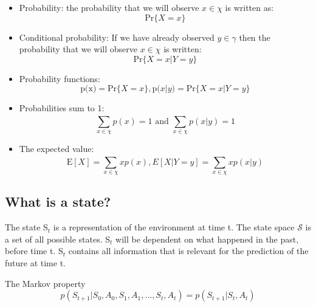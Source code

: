 \begin{itemize}
	\item Probability: the probability that we will observe $x \in \chi$ is written as: \\
		\begin{equation}
			\text{Pr}\{ X = x \}	
		\end{equation}
	\item Conditional probability: If we have already observed $y \in \gamma$ then the probability that we will observe $x \in \chi$ is written: \\
		\begin{equation}
			\text{Pr}\{X = x | Y = y\}
		\end{equation}
	\item Probability functions: \\
		\begin{equation}
			\text{p(x)} = \text{Pr}\{X=x \}, \text{p}(x |y) = \text{Pr}\{X=x | Y =y  \}
		\end{equation}
	\item Probabilities sum to 1: \\
		\begin{equation}
			\sum_{x \in \chi}^{} p(x) =1 \text{ and } \sum_{x \in \chi}^{} p(x |y) = 1
		\end{equation}
	\item The expected value: \\
		\begin{equation}
			\text{E} [X] = \sum_{x \in \chi}^{} xp(x), E[X |Y=y] = \sum_{x \in \chi}^{} xp(x |y) 
		\end{equation}
\end{itemize}


\subsection*{What is a state?}
The state S$_t$ is a representation of the environment at time t. The state space $\mathcal{S}$ is a set of all possible states. S$_t$ will be dependent on what happened in the past, before time t. S$_t$ contains all information that is relevant for the prediction of the future at time t.


\begin{wbox}{The Markov property}
\begin{equation}
	p(S_{t+1} | S_0,A_0,S_1,A_1,\ldots,S_t,A_t) = p(S_{t+1}	| S_t, A_t	)
\end{equation}
\end{wbox}


